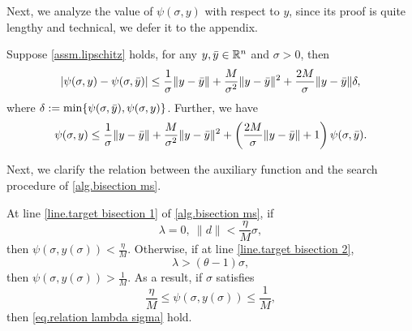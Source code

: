 \documentclass{article}
\begin{document}
Next, we analyze the value of $\psi(\sigma,y)$ with respect to $y$, since its proof is quite lengthy and technical, we defer it to the appendix.
\begin{lemma}
    \label{lem.psi property wrt y}
    Suppose \autoref{assm.lipschitz} holds, for any $y,\Bar{y} \in \mathbb{R}^n$ and $\sigma>0$, then 
    \begin{equation}
        \label{eq.psi property wrt y}
       \left \vert \psi(\sigma,y)-\psi(\sigma,\Bar{y}) \right\vert \leq \frac{1}{\sigma}\|y-\Bar{y}\| +\frac{M}{\sigma^2}\|y-\Bar{y}\|^2 +\frac{2M}{\sigma}\|y-\Bar{y}\|\delta,
    \end{equation}
    where $\delta:=\min\{\psi(\sigma,\Bar{y}),\psi(\sigma,y)\}$. Further, we have
    \begin{equation}
        \label{eq.psi property wrt y advanced}
        \psi(\sigma,y) \leq \frac{1}{\sigma}\|y-\Bar{y}\| +\frac{M}{\sigma^2}\|y-\Bar{y}\|^2 +\left(\frac{2M}{\sigma}\|y-\Bar{y}\|+1\right)\psi(\sigma,\Bar{y}).
    \end{equation}
\end{lemma}
Next, we clarify the relation between the auxiliary function and the search procedure of \autoref{alg.bisection ms}.
\begin{lemma}
    \label{lem.reduce line search}
    At line \ref{line.target bisection 1} of \autoref{alg.bisection ms}, if  
    \begin{equation}
    \label{eq.bracket small lambda}
    \lambda = 0, \ \|d\|<\frac{\eta}{M}\sigma,
    \end{equation}
then $\psi(\sigma,y(\sigma))<\frac{\eta}{M}$.  Otherwise, if at line \ref{line.target bisection 2},
\begin{equation}
    \label{eq.bracket big lambda}
    \lambda > (\theta-1)\sigma,
\end{equation}
then $\psi(\sigma,y(\sigma))>\frac{1}{M}$. As a result, if $\sigma$ satisfies
    \begin{equation}
        \label{eq.reduce line search interval}
        \frac{\eta}{M}\leq \psi(\sigma,y(\sigma)) \leq \frac{1}{M},
    \end{equation}
    then \eqref{eq.relation lambda sigma} hold.
\end{lemma}
\end{document}
